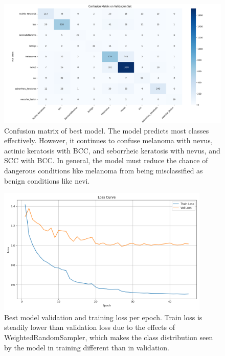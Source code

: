\documentclass{article} %
\begin{document}
\begin{figure}[h]
\begin{center}
\includegraphics[width=1.0\textwidth]{Figs/confusion_matrix.png}
\end{center}
\caption{Confusion matrix of best model. The model predicts most classes effectively. However, it continues to confuse melanoma with nevus, actinic keratosis with BCC, and seborrheic keratosis with nevus, and SCC with BCC. In general, the model must reduce the chance of dangerous conditions like melanoma from being misclassified as benign conditions like nevi.}
\end{figure}

\begin{figure}[h]
\begin{center}
\includegraphics[width=0.9\textwidth]{Figs/training_validation_loss.png}
\end{center}
\caption{Best model validation and training loss per epoch. Train loss is steadily lower than validation loss due to the effects of WeightedRandomSampler, which makes the class distribution seen by the model in training different than in validation.}
\end{figure}
\end{document}
